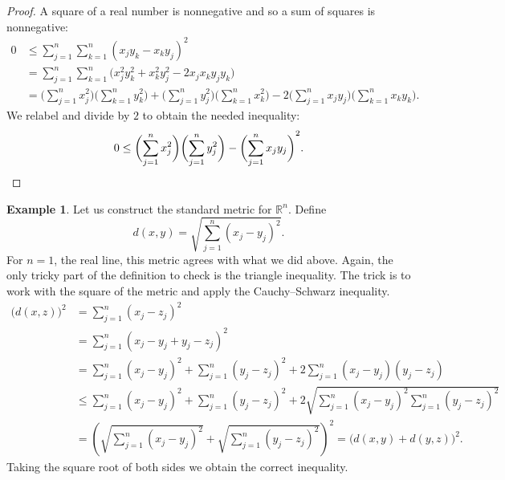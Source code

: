 \documentclass[12pt,openany]{book}
\newcommand{\R}{{\mathbb{R}}}
\theoremstyle{plain}
\theoremstyle{remark}
\theoremstyle{definition}
\theoremstyle{exercise}
\theoremstyle{example}
\newtheorem{example}[thm]{Example}
\begin{document}
\begin{proof}
A square of a real number is nonnegative and so a sum of squares is
nonnegative:
\begin{equation*}
\begin{split}
0 & \leq 
\sum_{j=1}^n \sum_{k=1}^n {(x_j y_k - x_k y_j)}^2
\\
& =
\sum_{j=1}^n \sum_{k=1}^n \bigl( x_j^2 y_k^2 + x_k^2 y_j^2 - 2 x_j x_k y_j
y_k \bigr)
\\
& =
\biggl( \sum_{j=1}^n x_j^2 \biggr)
\biggl( \sum_{k=1}^n y_k^2 \biggr)
+
\biggl( \sum_{j=1}^n y_j^2 \biggr)
\biggl( \sum_{k=1}^n x_k^2 \biggr)
-
2
\biggl( \sum_{j=1}^n x_j y_j \biggr)
\biggl( \sum_{k=1}^n x_k y_k \biggr) .
\end{split}
\end{equation*}
We relabel and divide by $2$ to obtain the needed inequality:
\begin{equation*}
0 \leq 
\biggl( \sum_{j=1}^n x_j^2 \biggr)
\biggl( \sum_{j=1}^n y_j^2 \biggr)
-
{\biggl( \sum_{j=1}^n x_j y_j \biggr)}^2 . \qedhere
\end{equation*}
\end{proof}

\begin{example}
Let us construct the
standard metric\index{standard metric on $\R^n$} for $\R^n$.  Define
\begin{equation*}
d(x,y) =
\sqrt{
\sum_{j=1}^n
{(x_j-y_j)}^2 
} .
\end{equation*}
For $n=1$, the real line, this metric agrees with what we did above.  Again,
the only tricky part of the definition to check is the triangle inequality.
The trick is to work with 
the square of the metric and apply
the Cauchy--Schwarz inequality.
\begin{equation*}
\begin{split}
{\bigl(d(x,z)\bigr)}^2 & =
\sum_{j=1}^n
{(x_j-z_j)}^2 
\\
& =
\sum_{j=1}^n
{(x_j-y_j+y_j-z_j)}^2 
\\
& =
\sum_{j=1}^n
{(x_j-y_j)}^2
+
\sum_{j=1}^n
{(y_j-z_j)}^2 
+
2
\sum_{j=1}^n
(x_j-y_j)(y_j-z_j)
\\
& \leq
\sum_{j=1}^n
{(x_j-y_j)}^2
+
\sum_{j=1}^n
{(y_j-z_j)}^2 
+
2
\sqrt{
\sum_{j=1}^n
{(x_j-y_j)}^2
\sum_{j=1}^n
{(y_j-z_j)}^2
}
\\
& =
{\left(
\sqrt{
\sum_{j=1}^n
{(x_j-y_j)}^2
}
+
\sqrt{
\sum_{j=1}^n
{(y_j-z_j)}^2 
}
\right)}^2
=
{\bigl( d(x,y) + d(y,z) \bigr)}^2 .
\end{split}
\end{equation*}
Taking the square root of both sides we obtain the correct inequality.
\end{example}
\end{document}
